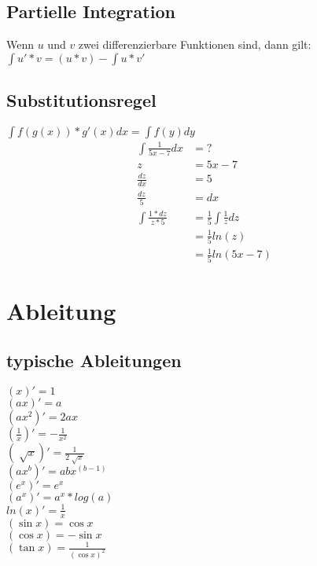 \documentclass[a4paper, landscape, 10pt]{article}
\begin{document}
\begin{multicols}{4}
\begin{small}
        \subsection{Partielle Integration}
        Wenn $u$ und $v$ zwei differenzierbare Funktionen sind, dann gilt: \\
        $\int u' * v = (u * v) - \int u * v'$
        \subsection{Substitutionsregel}
        $\int f(g(x)) * g'(x) dx = \int f(y) dy$
        \begin{align*}
            \int \frac{1}{5x - 7} dx &= ?\\
            z &= 5x - 7 \\
            \frac{dz}{dx} &= 5 \\   
            \frac{dz}{5} &= dx  \\
            \int \frac{1 * dz}{z * 5} &= \frac{1}{5} \int \frac{1}{z} dz \\
                                      &= \frac{1}{5} ln(z) \\
                                      &= \frac{1}{5} ln(5x-7)
        \end{align*}
    \section{Ableitung}
		\subsection{typische Ableitungen}
			\begin{multicols}{2}		
				$(x)' = 1$ \\
				$(ax)' = a$ \\
				$(ax^2)' = 2ax$ \\
				$(\frac{1}{x})' = -\frac{1}{x^2}$ \\
				$(\sqrt[]{x})' = \frac{1}{2\sqrt[]{x}}$ \\
				$(ax^b)' = abx^(b-1)$ \\
				$(e^x)' = e^x $ \\
				$(a^x)' = a^x*log(a) $ \\
				$ln(x)' = \frac{1}{x}$ \\
				$(\sin x) = \cos x$ \\
				$(\cos x) = -\sin x$ \\
				$(\tan x) = \frac{1}{(\cos x)^2}$ \\ 
			\end{multicols}

\end{small}
\end{multicols}
\end{document}
